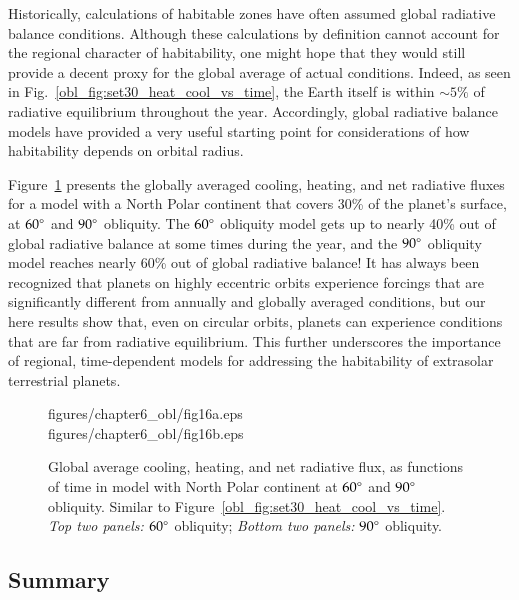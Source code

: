 Historically, calculations of habitable zones have often assumed
global radiative balance conditions.  Although these calculations by
definition cannot account for the regional character of habitability,
one might hope that they would still provide a decent proxy for the
global average of actual conditions.  Indeed, as seen in
Fig.~\ref{obl_fig:set30_heat_cool_vs_time}, the Earth itself is within
$\sim 5\%$ of radiative equilibrium throughout the year.  Accordingly,
global radiative balance models have provided a very useful starting
point for considerations of how habitability depends on orbital
radius.

Figure~\ref{obl_fig:set31_heat_cool_vs_time} presents the globally
averaged cooling, heating, and net radiative fluxes for a model with a
North Polar continent that covers 30\% of the planet's surface, at
$60\degr$ and $90\degr$ obliquity.  The $60\degr$ obliquity model gets
up to nearly 40\% out of global radiative balance at some times during
the year, and the $90\degr$ obliquity model reaches nearly 60\% out of
global radiative balance!  It has always been recognized that planets
on highly eccentric orbits experience forcings that are significantly
different from annually and globally averaged conditions, but our here
results show that, even on circular orbits, planets can experience
conditions that are far from radiative equilibrium.  This further
underscores the importance of regional, time-dependent models for
addressing the habitability of extrasolar terrestrial planets.


\begin{figure}[p]
\plotone
{figures/chapter6_obl/fig16a.eps} \\
\plotone
{figures/chapter6_obl/fig16b.eps}
\caption[Global average cooling, heating, and net radiative flux, as
functions of time in model with North Polar continent at $60\degr$ and
$90\degr$ obliquity.]{Global average cooling, heating, and net
radiative flux, as functions of time in model with North Polar
continent at $60\degr$ and $90\degr$ obliquity.
%
Similar to Figure~\ref{obl_fig:set30_heat_cool_vs_time}.  {\it Top two
panels:} $60\degr$ obliquity; {\it Bottom two panels:} $90\degr$
obliquity.}
\label{obl_fig:set31_heat_cool_vs_time}
\end{figure}

\clearpage

\subsection{Summary}
\label{obl_sssec:summary}

